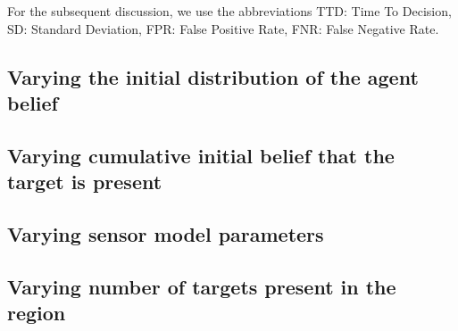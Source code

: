 For the subsequent discussion, we use the abbreviations TTD: Time To Decision, SD: Standard Deviation, FPR: False Positive Rate, FNR: False Negative Rate.
    
\subsection{Varying the initial distribution of the agent belief}\label{subsubsec:VaryingPriorShape}

\break

\subsection{Varying cumulative initial belief that the target is present}\label{subsubsec:VaryingPriorCumulative}

\break


\subsection{Varying sensor model parameters}\label{subsubsec:MicalibratedSensor}

\break

\subsection{Varying number of targets present in the region}\label{subsubsec:VaryingNoTargets}

%


\break